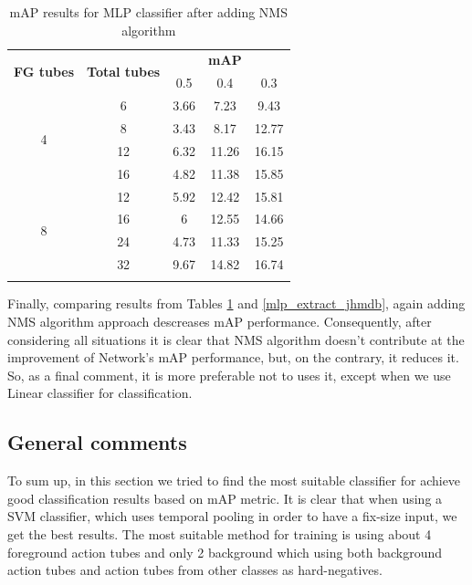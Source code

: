 \documentclass{report}
\begin{document}
\begin{center}
  \begin{longtable}{|| c | c || c c c ||}
    \hline
    \multirow{2}{*}{\textbf{FG tubes}} & \multirow{2}{*}{\textbf{Total tubes}} & {} & \textbf{mAP} & {} \\
    {} & {} & 0.5 & 0.4 & 0.3 \\
    \hline
    \multirow{4}{*}{4} & 6 & 3.66 & 7.23 & 9.43 \\
    \cline{2-5}
    {} & 8 & 3.43 & 8.17 & 12.77 \\
    \cline{2-5}
    {} & 12 & 6.32 & 11.26 & 16.15 \\
    \cline{2-5}
    {} & 16 & 4.82 & 11.38 & 15.85 \\
    \hline
    \multirow{4}{*}{8} & 12 & 5.92 & 12.42 & 15.81  \\
    \cline{2-5}
    {} & 16 & 6 & 12.55 & 14.66 \\
    \cline{2-5}
    {} & 24 & 4.73 & 11.33 & 15.25 \\
    \cline{2-5}
    {} & 32 & 9.67 & 14.82 & 16.74 \\
    \hline

  \caption{mAP results for MLP classifier after adding NMS algorithm}
  \label{table:mlp_nms}
\end{longtable}
\end{center}

Finally, comparing results from Tables \ref{table:mlp_nms} and \ref{mlp_extract_jhmdb}, again adding NMS algorithm approach descreases mAP performance. Consequently, after considering all
situations it is clear that NMS algorithm doesn't contribute at the improvement of Network's mAP performance, but, on the contrary, it reduces it. So, as a final comment, it is more preferable
not to uses it, except when we use Linear classifier for classification. \par

\subsection{General comments}
To sum up, in this section we tried to find the most suitable classifier for achieve good classification results based on mAP metric. It is clear that when using a SVM classifier, which uses
temporal pooling in order to have a fix-size input, we get the best results. The most suitable method for training is using about 4 foreground action tubes and only 2 background which using
both background action tubes and action tubes from other classes as hard-negatives. \par
\end{document}
